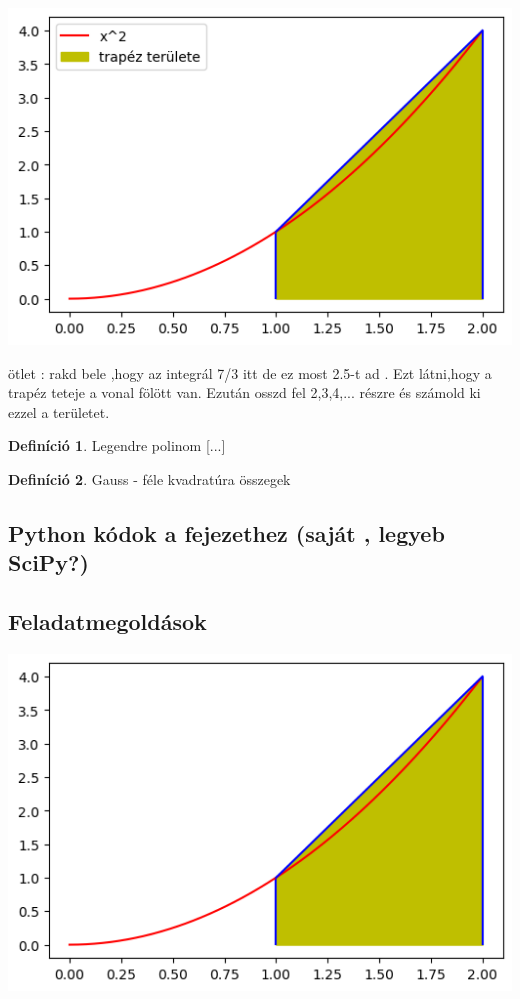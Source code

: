 \documentclass{article}
\theoremstyle{definition}
\newtheorem{definition}{Definíció}
\begin{document}
\includegraphics{plots/trapez_with_area.png}

ötlet : rakd bele ,hogy az integrál 7/3 itt de ez most 2.5-t ad . Ezt látni,hogy a trapéz teteje a vonal fölött van. Ezután osszd fel 2,3,4,... részre és számold ki ezzel a területet.
\begin{definition}
Legendre polinom
[...]
\end{definition}
\begin{definition}
Gauss - féle kvadratúra összegek
\end{definition}

\subsection{Python kódok a fejezethez (saját , legyeb SciPy?)}

\subsection{Feladatmegoldások}
\includegraphics{plots/Unknown.png}
\end{document}
